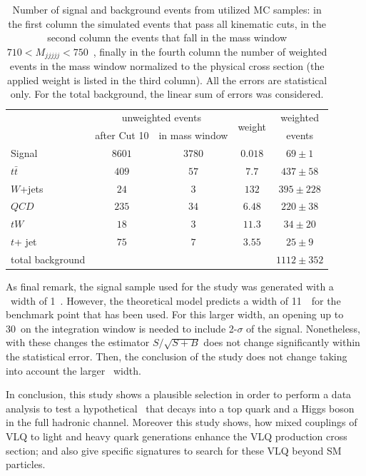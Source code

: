 \begin{table}[tb]
\begin{center}
\begin{tabular}{l|c|c|c|c}
 & \multicolumn{2}{c|}{unweighted events}  & \multirow{2}{*}{weight} & weighted  \\
 & after Cut 10 & in mass window & & events \\
 \hline
 Signal & $8601$ & $3780$ & $0.018$ &$69 \pm 1$ \\
 \hline
   $t \bar{t}$ & $409$ & $57$ & $7.7$ & $437 \pm 58$ \\
 $W$+jets & $24$ & $3$ & $132$ & $395 \pm 228$ \\
 $QCD$ & $235$ & $34$ & $6.48$ & $220 \pm 38$ \\
 $tW$ & $18$ & $3$ & $11.3$ & $34 \pm 20$ \\
 $t$+ jet & $75$ & $7$ & $3.55$ & $25 \pm 9$ \\
  \hline
  total background & & & & $1112 \pm 352$ \\
\end{tabular}
\caption{Number of signal and background events from utilized MC samples: in the first column the simulated events that pass all kinematic cuts, in the second column the events that fall in the mass window ${710<M_{jjjjj}<750}$~\GeVcc, finally in the fourth column the number of weighted events in the mass window normalized to the physical cross section (the applied weight is listed in the third column). All the errors are statistical only. For the total background, the linear sum of errors was considered.} \label{tab:events} 
\end{center}
\end{table}

As final remark, the signal sample used for the study was generated with a \Tp~width of 1~\GeVcc. However, the theoretical model predicts a width of 11~\GeVcc~for the benchmark point that has been used. For this larger width, an opening up to 30~\GeVcc on the integration window is needed to include 2-$\sigma$ of the signal. Nonetheless, with these changes the estimator $S/\sqrt{S+B}$ does not change significantly within the statistical error. Then, the conclusion of the study does not change taking into account the larger \Tp~width.

In conclusion, this study shows a plausible selection in order to perform a data analysis to test a hypothetical \Tp~that decays into a top quark and a Higgs boson in the full hadronic channel. Moreover this study shows, how mixed couplings of VLQ to light and heavy quark generations enhance the VLQ production cross section; and also give specific signatures to search for these VLQ beyond SM particles. 

